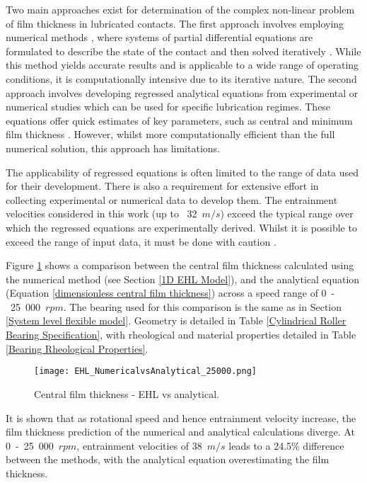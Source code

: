 Two main approaches exist for determination of the complex non-linear problem of film thickness in lubricated contacts. The first approach involves employing numerical methods \cite{Dowson1959}, where systems of partial differential equations are formulated to describe the state of the contact and then solved iteratively \cite{Gohar2018}. While this method yields accurate results and is applicable to a wide range of operating conditions, it is computationally intensive due to its iterative nature. The second approach involves developing regressed analytical equations from experimental or numerical studies which can be used for specific lubrication regimes. These equations offer quick estimates of key parameters, such as central \cite{Dowson1979} and minimum film thickness \cite{Dowson1967}. However, whilst more computationally efficient than the full numerical solution, this approach has limitations.
 
The applicability of regressed equations is often limited to the range of data used for their development. There is also a requirement for extensive effort in collecting experimental or numerical data to develop them. The entrainment velocities considered in this work (up to ~32~$m/s$) exceed the typical range over which the regressed equations are experimentally derived. Whilst it is possible to exceed the range of input data, it must be done with caution \cite{Gohar1988}.

Figure \ref{EHL_NumericalvsAnalytical_25000} shows a comparison between the central film thickness calculated using the numerical method (see Section \ref{1D EHL Model}), and the analytical equation (Equation \ref{dimensionless central film thickness}) across a speed range of 0~-~25~000~$rpm$. The bearing used for this comparison is the same as in Section \ref{System level flexible model}. Geometry is detailed in Table \ref{Cylindrical Roller Bearing Specification}, with rheological and material properties detailed in Table \ref{Bearing Rheological Properties}.

\begin{figure}
	\centering
	\texttt{[image: EHL\_NumericalvsAnalytical\_25000.png]}
	\caption{Central film thickness - EHL vs analytical.}
	\label{EHL_NumericalvsAnalytical_25000}
\end{figure} 

It is shown that as rotational speed and hence entrainment velocity increase, the film thickness prediction of the numerical and analytical calculations diverge. At 0~-~25~000~$rpm$, entrainment velocities of 38~$m/s$ leads to a 24.5\% difference between the methods, with the analytical equation overestimating the film thickness.

